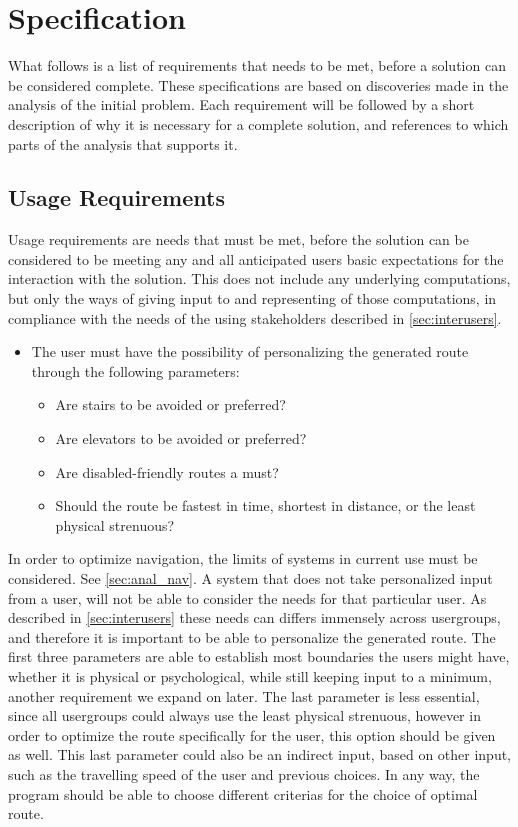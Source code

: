 \section{Specification} %
\label{sec:specification}

What follows is a list of requirements that needs to be met, before a solution can be considered complete. These specifications are based on discoveries made in the analysis of the initial problem. Each requirement will be followed by a short description of why it is necessary for a complete solution, and references to which parts of the analysis that supports it.

\subsection{Usage Requirements}

Usage requirements are needs that must be met, before the solution can be considered to be meeting any and all anticipated users basic expectations for the interaction with the solution. This does not include any underlying computations, but only the ways of giving input to and representing of those computations, in compliance with the needs of the using stakeholders described in \cref{sec:interusers}.

\begin{itemize}
	\item The user must have the possibility of personalizing the generated route through the following parameters:
			\begin{itemize}
				\item Are stairs to be avoided or preferred?
				\item Are elevators to be avoided or preferred?
				\item Are disabled-friendly routes a must?
				\item Should the route be fastest in time, shortest in distance, or the least physical strenuous?
			\end{itemize}
\end{itemize}
In order to optimize navigation, the limits of systems in current use must be considered. See \cref{sec:anal_nav}. A system that does not take personalized input from a user, will not be able to consider the needs for that particular user. As described in \cref{sec:interusers} these needs can differs immensely across usergroups, and therefore it is important to be able to personalize the generated route.
The first three parameters are able to establish most boundaries the users might have, whether it is physical or psychological, while still keeping input to a minimum, another requirement we expand on later. The last parameter is less essential, since all usergroups could always use the least physical strenuous, however in order to optimize the route specifically for the user, this option should be given as well. This last parameter could also be an indirect input, based on other input, such as the travelling speed of the user and previous choices. In any way, the program should be able to choose different criterias for the choice of optimal route.

